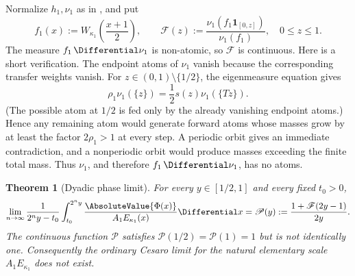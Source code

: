 \documentclass[11pt,oneside]{article}
\newtheorem{theorem}{Theorem}[section]
\theoremstyle{definition}
\theoremstyle{remark}
\newcommand{\Phiup}{\Phi}
\begin{document}
Normalize $h_1,\nu_1$ as in , and put
\[
 f_1(x):=W_{\kappa_1}\!\left(\frac{x+1}{2}\right),
 \qquad
 \mathscr F(z):=
 \frac{\nu_1(f_1\mathbf1_{[0,z]})}{\nu_1(f_1)},
 \quad 0\le z\le1.
 \label{eq:phase-distribution}
\]
The measure $f_1\,\Differential\nu_1$ is non-atomic, so $\mathscr F$ is continuous.  Here is a
short verification.  The endpoint atoms of $\nu_1$ vanish because the corresponding
transfer weights vanish.  For $z\in(0,1)\setminus\{1/2\}$, the eigenmeasure equation gives
\[
 \rho_1\nu_1(\{z\})=\frac12s(z)\nu_1(\{Tz\}).
\]
(The possible atom at $1/2$ is fed only by the already vanishing endpoint atoms.)  Hence any
remaining atom would generate forward atoms whose masses grow by at least the factor
$2\rho_1>1$ at every step.  A periodic orbit gives an immediate contradiction, and a
nonperiodic orbit would produce masses exceeding the finite total mass.  Thus $\nu_1$, and
therefore $f_1\,\Differential\nu_1$, has no atoms.

\begin{theorem}[Dyadic phase limit]
\label{thm:phase-limit}
For every $y\in[1/2,1]$ and every fixed $t_0>0$,
\begin{equation}
 \lim_{n\to\infty}
 \frac1{2^ny-t_0}\int_{t_0}^{2^ny}
 \frac{\AbsoluteValue{\Phiup(x)}}{A_1E_{\kappa_1}(x)}\Differential x
 =\mathscr P(y):=\frac{1+\mathscr F(2y-1)}{2y}.
 \label{eq:phase-limit}
\end{equation}
The continuous function $\mathscr P$ satisfies
$\mathscr P(1/2)=\mathscr P(1)=1$ but is not identically one.  Consequently the ordinary
Cesaro limit for the natural elementary scale $A_1E_{\kappa_1}$ does not exist.
\end{theorem}
\end{document}
